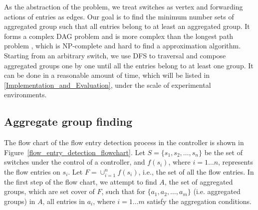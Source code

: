 As the abstraction of the problem, we treat switches as vertex and forwarding actions of entries as edges. Our goal is to find the minimum number sets of aggregated group such that all entries belong to at least an aggregated group. It forms a complex DAG problem and is more complex than the longest path problem \cite{DMR97,RU04}, which is NP-complete and hard to find a approximation algorithm. Starting from an arbitrary switch, we use DFS to traversal and compose aggregated groups one by one until all the entries belong to at least one group. It can be done in a reasonable amount of time, which will be listed in \ref{Implementation_and_Evaluation}, under the scale of experimental environments.


\subsection{Aggregate group finding}
\label{Aggregated_group_finding}

The flow chart of the flow entry detection process in the controller is shown in Figure~\ref{flow_entry_detection_flowchart}. Let $S=\{s_1,s_2,\ldots,s_n\}$ be the set of switches under the control of a controller, and $f(s_i)$, where $i=1\ldots n$, represents the flow entries on $s_i$. Let $F=\cup_{i=1}^n f(s_i)$, i.e., the set of all the flow entries. In the first step of the flow chart, we attempt to find $A$, the set of aggregated groups, which are set cover of $F$, such that for $\{a_1, a_2, \ldots, a_m\}$ (i.e. aggregated groups) in $A$, all entries in $a_i$, where $i=1\ldots m$ satisfy the aggregation conditions.

